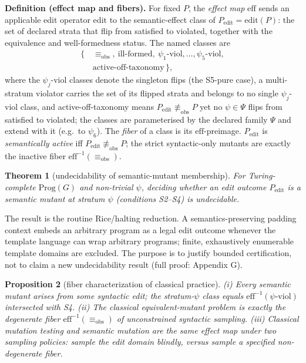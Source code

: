 \documentclass[review,12pt,authoryear]{elsarticle}
\newtheorem{theorem}{Theorem}
\newtheorem{proposition}[theorem]{Proposition}
\begin{document}
\textbf{Definition (effect map and fibers).} For fixed $P$, the
\emph{effect map} $\mathrm{eff}$ sends an applicable edit operator
$\mathrm{edit}$ to the
semantic-effect class of $P_{\mathrm{edit}} = \mathrm{edit}(P)$: the set
of declared strata that flip from satisfied to violated, together with
the equivalence and well-formedness status. The named classes are
\[
\begin{aligned}
\{\,&\equiv_{\mathrm{obs}},\ \text{ill-formed},\
      \psi_1\text{-viol}, \dots, \psi_5\text{-viol},\\
   &\text{active-off-taxonomy}\,\},
\end{aligned}
\]
where the $\psi_j$-viol classes denote the singleton flips (the
S5-pure case), a multi-stratum violator carries the set of its flipped
strata and belongs to no single $\psi_j$-viol class, and
active-off-taxonomy means $P_{\mathrm{edit}} \not\equiv_{\mathrm{obs}} P$ yet no
$\psi \in \Psi$ flips from satisfied to violated; the classes are
parameterised by the declared family $\Psi$ and extend with it
(e.g.\ to $\psi_6$). The \emph{fiber} of a
class is its $\mathrm{eff}$-preimage. $P_{\mathrm{edit}}$ is \emph{semantically active} iff
$P_{\mathrm{edit}} \not\equiv_{\mathrm{obs}} P$; the strict syntactic-only mutants are exactly
the inactive fiber $\mathrm{eff}^{-1}(\equiv_{\mathrm{obs}})$.

\begin{theorem}[undecidability of semantic-mutant membership]\label{thm:undecidability}
For
Turing-complete $\mathrm{Prog}(G)$ and non-trivial $\psi$, deciding
whether an edit outcome $P_{\mathrm{edit}}$ is a semantic mutant at stratum $\psi$
(conditions S2--S4) is undecidable.
\end{theorem}

The result is the routine Rice/halting reduction. A
semantics-preserving padding context embeds an arbitrary program as a
legal edit outcome whenever the template language can wrap arbitrary
programs; finite, exhaustively enumerable template domains are excluded.
The purpose is to justify bounded certification, not to claim a new
undecidability result (full proof: Appendix G).

\begin{proposition}[fiber characterization of classical practice]\label{prop:fiber}
(i) Every semantic mutant arises from some syntactic edit; the
stratum-$\psi$ class equals $\mathrm{eff}^{-1}(\psi\text{-viol})$ intersected
with S4. (ii) The classical equivalent-mutant problem is exactly the
degenerate fiber $\mathrm{eff}^{-1}(\equiv_{\mathrm{obs}})$ of unconstrained syntactic
sampling. (iii) Classical mutation testing and semantic mutation are the
same effect map under two sampling policies: sample the edit domain
blindly, versus sample a specified non-degenerate fiber.
\end{proposition}
\end{document}
